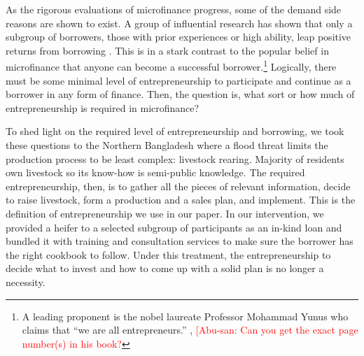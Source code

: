 	As the rigorous evaluations of microfinance progress, some of the demand side reasons are shown to exist. A group of influential research has shown that only a subgroup of borrowers, those with prior experiences or high ability, leap positive returns from borrowing \citep{Banerjee2015Miracle, Mckenzie2017Spurring, Banerjee2019MFPovertyTrap, BueraKaboskiShin2020}. This is in a stark contrast to the popular belief in microfinance that anyone can become a successful borrower.\footnote{A leading proponent is the nobel laureate Professor Mohammad Yunus who claims that ``we are all entrepreneurs.'' \citep{Yunus2003}, \citep{Cosic2017} \textcolor{red}{[Abu-san: Can you get the exact page number(s) in his book?} } Logically, there must be some minimal level of entrepreneurship to participate and continue as a borrower in any form of finance. Then, the question is, what sort or how much of entrepreneurship is required in microfinance? 

	 \citet{Balboni2020} 

	To shed light on the required level of entrepreneurship and borrowing, we took these questions to the Northern Bangladesh where a flood threat limits the production process to be least complex: livestock rearing. Majority of residents own livestock so its know-how is semi-public knowledge. The required entrepreneurship, then, is to gather all the pieces of relevant information, decide to raise livestock, form a production and a sales plan, and implement. This is the definition of entrepreneurship we use in our paper. In our intervention, we provided a heifer to a selected subgroup of participants as an in-kind loan and bundled it with training and consultation services to make sure the borrower has the right cookbook to follow. Under this treatment, the entrepreneurship to decide what to invest and how to come up with a solid plan is no longer a necessity. 

